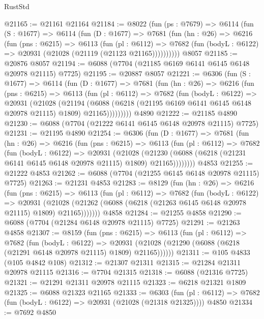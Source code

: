 \begin{lexlean}{RustStd}
\begin{coremodule}
@21165 := @21161 @21164
@21184 := @8022
    (fun (ps : @7679) =>
    @6114
      (fun (S : @1677) =>
      @6114
        (fun (D : @1677) =>
        @7681
          (fun (hn : @26) =>
          @6216
            (fun (pns : @6215) =>
            @6113
              (fun (pl : @6112) =>
              @7682 (fun (bodyL : @6122) => @20931 (@21028 (@21119 (@21123 @21165))))))))))
    @8057
@21185 := @20876 @8057
@21194 := @6088 (@7704 (@21185 @6169 @6141 @6145 @6148 @20978 @21115) @7725)
@21195 := @20887 @8057
@21221 := @6306
    (fun (S : @1677) =>
    @6114
      (fun (D : @1677) =>
      @7681
        (fun (hn : @26) =>
        @6216
          (fun (pns : @6215) =>
          @6113
            (fun (pl : @6112) =>
            @7682
              (fun (bodyL : @6122) =>
              @20931
                (@21028
                  (@21194
                    (@6088
                      (@6218 (@21195 @6169 @6141 @6145 @6148 @20978 @21115) @1809)
                      @21165)))))))))
    @4890
@21222 := @21185 @4890
@21230 := @6088 (@7704 (@21222 @6141 @6145 @6148 @20978 @21115) @7725)
@21231 := @21195 @4890
@21254 := @6306
    (fun (D : @1677) =>
    @7681
      (fun (hn : @26) =>
      @6216
        (fun (pns : @6215) =>
        @6113
          (fun (pl : @6112) =>
          @7682
            (fun (bodyL : @6122) =>
            @20931
              (@21028
                (@21230 (@6088 (@6218 (@21231 @6141 @6145 @6148 @20978 @21115) @1809) @21165))))))))
    @4853
@21255 := @21222 @4853
@21262 := @6088 (@7704 (@21255 @6145 @6148 @20978 @21115) @7725)
@21263 := @21231 @4853
@21283 := @8129
    (fun (hn : @26) =>
    @6216
      (fun (pns : @6215) =>
      @6113
        (fun (pl : @6112) =>
        @7682
          (fun (bodyL : @6122) =>
          @20931
            (@21028 (@21262 (@6088 (@6218 (@21263 @6145 @6148 @20978 @21115) @1809) @21165)))))))
    @4858
@21284 := @21255 @4858
@21290 := @6088 (@7704 (@21284 @6148 @20978 @21115) @7725)
@21291 := @21263 @4858
@21307 := @8159
    (fun (pns : @6215) =>
    @6113
      (fun (pl : @6112) =>
      @7682
        (fun (bodyL : @6122) =>
        @20931 (@21028 (@21290 (@6088 (@6218 (@21291 @6148 @20978 @21115) @1809) @21165))))))
@21311 := @105 @4833 (@105 @4842 @108)
@21312 := @21307 @21311
@21315 := @21284 @21311 @20978 @21115
@21316 := @7704 @21315
@21318 := @6088 (@21316 @7725)
@21321 := @21291 @21311 @20978 @21115
@21323 := @6218 @21321 @1809
@21325 := @6088 @21323 @21165
@21333 := @6303
    (fun (pl : @6112) => @7682 (fun (bodyL : @6122) => @20931 (@21028 (@21318 @21325))))
    @4850
@21334 := @7692 @4850

\end{coremodule}
\end{lexlean}
